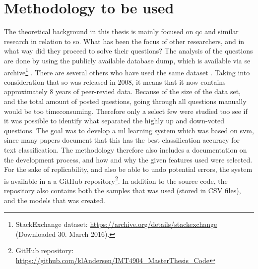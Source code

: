 \section{Methodology to be used}
\label{sec:methodology_to_use}
The theoretical background in this thesis is mainly focused on \gls{qc} and similar research in relation to \gls{so}.
What has been the focus of other researchers, and in what way did they proceed to solve their questions?
The analysis of the questions are done by using the publicly available database dump, which is available via \gls{se} 
archive\footnote{StackExchange dataset: \url{https://archive.org/details/stackexchange} \\ (Downloaded 30. March 2016).} \cite{StackExchange2016} . 
There are several others who have used the same dataset .
Taking into consideration that \gls{so} was released in 2008, it means that it now contains approximately 8 years of peer-revied data.
Because of the size of the data set, and the total amount of posted questions, going through all questions manually would be too timeconsuming.
Therefore only a select few were studied too see if it was possible to identify what separated the highly up and down-voted questions.
\vspace{0.5em}\newline
The goal was to develop a \gls{ml} learning system which was based on \gls{svm}, since many papers document that this has the best classification accuracy for text classification. 
The methodology therefore also includes a documentation on the development process, and how and why the given features used were selected.
\vspace{0.5em}\newline
For the sake of replicability, and also be able to undo potential errors, the system is available in a a GitHub repository\footnote{
	GitHub repository: 
	\url{https://github.com/klAndersen/IMT4904_MasterThesis_Code}
}. 
In addition to the source code, the repository also contains both the samples that was used (stored in CSV files), and the models that was created. 


